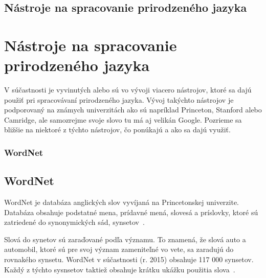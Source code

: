 %
%
{
	\subsection{Nástroje na spracovanie prirodzeného jazyka}
}
{
	\section{Nástroje na spracovanie prirodzeného jazyka}
}
\label{subsec:nlp_nastroje}
V súčastnosti je vyvinutých alebo sú vo vývoji viacero nástrojov, ktoré sa dajú použiť pri spracovávaní prirodzeného jazyka. Vývoj takýchto nástrojov je podporovaný na známych univerzitách ako sú napríklad Princeton, Stanford alebo Camridge, ale samozrejme svoje slovo tu má aj velikán Google. Pozrieme sa bližšie na niektoré z týchto nástrojov, čo ponúkajú a ako sa dajú využiť.

%
%
{
	\subsubsection{WordNet}
}
{
	\subsection{WordNet}
}
\label{subsubsec:wordnet}
WordNet je databáza anglických slov vyvíjaná na Princetonskej univerzite. Databáza obsahuje podstatné mena, prídavné mená, slovesá a príslovky, ktoré sú zatriedené do synonymických sád, synsetov~\cite{WordNetPage}.

Slová do synetov sú zaraďované podľa významu. To znamená, že slová auto a automobil, ktoré sú pre svoj význam zameniteľné vo vete, sa zaradujú do rovnakého synsetu. WordNet v súčastnosti (r. 2015) obsahuje 117 000 synsetov. Každý z týchto sysnsetov taktiež obsahuje krátku ukážku použitia slova~\cite{WordNetPage}.

